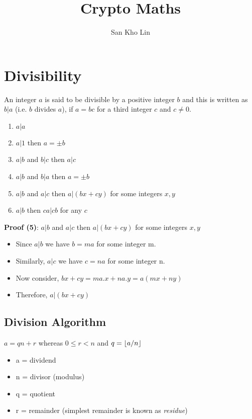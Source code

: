 \documentclass[a4paper]{article}
\title{Crypto Maths}
\author{San Kho Lin}
\date{}
\DeclarePairedDelimiter\floor{\lfloor}{\rfloor}
\begin{document}
\maketitle

\section{Divisibility}

An integer $a$ is said to be divisible by a positive integer $b$ and this is written as $b|a$ (i.e. $b$ divides $a$), if $a = bc$ for a third integer $c$ and $c \neq 0$.

\begin{enumerate}
\item $a|a$
\item $a|1$ then $a = \pm b$
\item $a|b$ and $b|c$ then $a|c$
\item $a|b$ and $b|a$ then $a = \pm b$
\item $a|b$ and $a|c$ then $a|(bx + cy)$ for some integers $x, y$
\item $a|b$ then $ca|cb$ for any $c$
\end{enumerate}

\textbf{Proof (5)}: $a|b$ and $a|c$ then $a|(bx + cy)$ for some integers $x, y$
\begin{itemize}
\item Since $a|b$ we have $b = ma$ for some integer m.
\item Similarly, $a|c$ we have $c = na$ for some integer n.
\item Now consider, $bx + cy = ma.x + na.y = a (mx + ny)$
\item Therefore, $a|(bx + cy)$ 
\end{itemize}


\subsection{Division Algorithm}

$a = qn + r$  whereas $0 \leq r < n$ and $q = \floor*{a/n}$

\begin{itemize}
\item a = dividend
\item n = divisor (modulus)
\item q = quotient
\item r = remainder (simplest remainder is known as \textit{residue})
\end{itemize}
\end{document}
